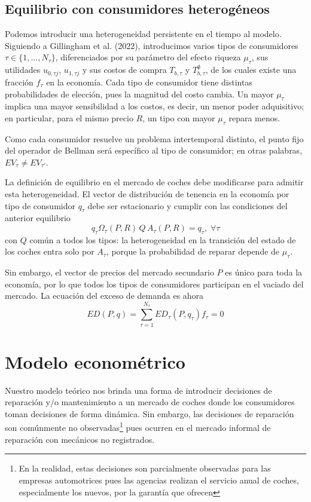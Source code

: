 \documentclass{article}
\begin{document}
\subsection{Equilibrio con consumidores heterogéneos}

Podemos introducir una heterogeneidad persistente en el tiempo al modelo. Siguiendo a Gillingham et al. (2022), introducimos varios tipos de consumidores $\tau\in \{1,\dots,N_\tau\}$, diferenciados por su parámetro del efecto riqueza $\mu_\tau$, sus utilidades $u_{0,\tau j}$, $u_{1,\tau j}$ y sus costos de compra $T_{b,\tau}$ y $T^{\emptyset}_{b,\tau}$, de los cuales existe una fracción $f_\tau$ en la economía. Cada tipo de consumidor tiene distintas probabilidades de elección, pues la magnitud del costo cambia. Un mayor $\mu_\tau$ implica una mayor sensibilidad a los costos, es decir, un menor poder adquisitivo; en particular, para el mismo precio $R$, un tipo con mayor $\mu_\tau$ repara menos.

Como cada consumidor resuelve un problema intertemporal distinto, el punto fijo del operador de Bellman será específico al tipo de consumidor; en otras palabras, $EV_\tau \neq EV_{\tau'}$.

La definición de equilibrio en el mercado de coches debe modificarse para admitir esta heterogeneidad. El vector de distribución de tenencia en la economía por tipo de consumidor $q_\tau$ debe ser estacionario y cumplir con las condiciones del anterior equilibrio
$$q_\tau \Omega_\tau(P,R)\,Q\, A_\tau(P,R)=q_\tau,\; \forall \tau$$
con $Q$ común a todos los tipos: la heterogeneidad en la transición del estado de los coches entra solo por $A_\tau$, porque la probabilidad de reparar depende de $\mu_\tau$.

Sin embargo, el vector de precios del mercado secundario $P$ es único para toda la economía, por lo que todos los tipos de consumidores participan en el vaciado del mercado. La ecuación del exceso de demanda es ahora
$$ED(P,q)=\sum_{\tau=1}^{N_\tau}ED_\tau(P,q_\tau)f_\tau=0$$



\section{Modelo econométrico}

Nuestro modelo teórico nos brinda una forma de introducir decisiones de reparación y/o mantenimiento a un mercado de coches donde los consumidores toman decisiones de forma dinámica. Sin embargo, las decisiones de reparación son comúnmente no observadas\footnote{En la realidad, estas decisiones son parcialmente observadas para las empresas automotrices pues las agencias realizan el servicio anual de coches, especialmente los nuevos, por la garantía que ofrecen} pues ocurren en el mercado informal de reparación con mecánicos no registrados.
\end{document}
